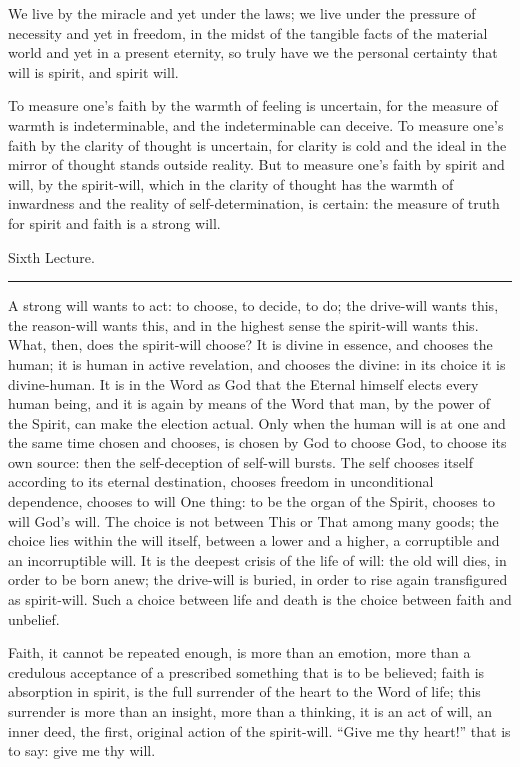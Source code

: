 \documentclass[12pt,a4paper,openany]{book}
\newcommand{\opage}[1]{\marginnote{\footnotesize\textit{[#1]}}}
\newcommand{\lecture}[1]{\clearpage\begin{center}{\large #1}\\[0.4em]\rule{3em}{0.4pt}\end{center}\medskip\noindent}
\begin{document}
We live by the miracle and yet under the laws; we live
under the pressure of necessity and yet in freedom, in the midst of
the tangible facts of the material world and
yet in a present eternity, so truly have we the personal
certainty that will is spirit, and spirit will.

To measure one's faith by the warmth of feeling is uncertain,
for the measure of warmth is indeterminable, and the indeterminable
can deceive. To measure one's faith by the clarity of thought is
uncertain, for clarity is cold and the ideal in the mirror of thought
stands outside reality. But to measure one's faith by
spirit and will, by the spirit-will, which in the clarity of thought
has the warmth of inwardness and the reality of self-determination,
is certain: the measure of truth for spirit and faith is
a strong will.

\setcounter{footnote}{0}%
\lecture{Sixth Lecture.}\opage{65}

A strong will wants to act: to choose, to decide, to do;
the drive-will wants this, the reason-will wants this, and in the highest sense
the spirit-will wants this. What, then, does the spirit-will choose? It
is divine in essence, and chooses the human; it
is human in active revelation, and chooses the divine:
in its choice it is divine-human. It is
in the Word as God that the Eternal himself elects every human being,
and it is again by means of the Word that man, by the power
of the Spirit, can make the election actual. Only when the
human will is at one and the same time chosen and chooses, is chosen
by God to choose God, to choose its own source: then
the self-deception of self-will bursts. The self chooses itself according to its
eternal destination, chooses freedom in unconditional dependence,
chooses to will One thing: to be the organ of the Spirit, chooses to will
God's will. The choice is not between This or That
among many goods; the choice lies within the will itself, between
a lower and a higher, a corruptible and an incorruptible will. It
is the deepest crisis of the life of will: the old will dies, in order to be
born anew; the drive-will is buried, in order to rise again transfigured
as spirit-will. Such a choice between life and death
is the choice between faith and unbelief.

Faith, it cannot be repeated enough, is more than
an emotion, more than a credulous acceptance of a prescribed
something that is to be believed; faith is absorption
\setcounter{footnote}{0}%
\opage{66}in spirit, is the full surrender of the heart to the Word of life; this
surrender is more than an insight, more than a thinking,
it is an act of will, an inner deed, the first,
original action of the spirit-will. ``Give me thy heart!'' that is to say:
give me thy will.
\end{document}
